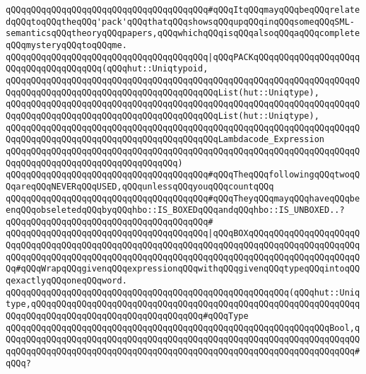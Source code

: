 \verb|qQQqqQQqqQQqqQQqqQQqqQQqqQQqqQQqqQQqqQQq#qQQqItqQQqmayqQQqbeqQQqrelatedqQQqtoqQQqtheqQQq'pack'qQQqthatqQQqshowsqQQqupqQQqinqQQqsomeqQQqSML-semanticsqQQqtheoryqQQqpapers,qQQqwhichqQQqisqQQqalsoqQQqaqQQqcompleteqQQqmysteryqQQqtoqQQqme.|\newline
\verb|qQQqqQQqqQQqqQQqqQQqqQQqqQQqqQQqqQQqqQQq|\verb#|qQQqPACKqQQqqQQqqQQqqQQqqQQqqQQqqQQqqQQqqQQqqQQq(qQQqhut::Uniqtypoid,#\newline
\verb|qQQqqQQqqQQqqQQqqQQqqQQqqQQqqQQqqQQqqQQqqQQqqQQqqQQqqQQqqQQqqQQqqQQqqQQqqQQqqQQqqQQqqQQqqQQqqQQqqQQqqQQqqQQqqQQqList(hut::Uniqtype),|\newline
\verb|qQQqqQQqqQQqqQQqqQQqqQQqqQQqqQQqqQQqqQQqqQQqqQQqqQQqqQQqqQQqqQQqqQQqqQQqqQQqqQQqqQQqqQQqqQQqqQQqqQQqqQQqqQQqqQQqList(hut::Uniqtype),|\newline
\verb|qQQqqQQqqQQqqQQqqQQqqQQqqQQqqQQqqQQqqQQqqQQqqQQqqQQqqQQqqQQqqQQqqQQqqQQqqQQqqQQqqQQqqQQqqQQqqQQqqQQqqQQqqQQqqQQqLambdacode_Expression|\newline
\verb|qQQqqQQqqQQqqQQqqQQqqQQqqQQqqQQqqQQqqQQqqQQqqQQqqQQqqQQqqQQqqQQqqQQqqQQqqQQqqQQqqQQqqQQqqQQqqQQqqQQqqQQq)|\newline
\newline
\verb|qQQqqQQqqQQqqQQqqQQqqQQqqQQqqQQqqQQqqQQq#qQQqTheqQQqfollowingqQQqtwoqQQqareqQQqNEVERqQQqUSED,qQQqunlessqQQqyouqQQqcountqQQq|\newline
\verb|qQQqqQQqqQQqqQQqqQQqqQQqqQQqqQQqqQQqqQQq#qQQqTheyqQQqmayqQQqhaveqQQqbeenqQQqobseletedqQQqbyqQQqhbo::IS_BOXEDqQQqandqQQqhbo::IS_UNBOXED..?|\newline
\verb|qQQqqQQqqQQqqQQqqQQqqQQqqQQqqQQqqQQqqQQq#|\newline
\verb|qQQqqQQqqQQqqQQqqQQqqQQqqQQqqQQqqQQqqQQq|\verb#|qQQqBOXqQQqqQQqqQQqqQQqqQQqqQQqqQQqqQQqqQQqqQQqqQQqqQQqqQQqqQQqqQQqqQQqqQQqqQQqqQQqqQQqqQQqqQQqqQQqqQQqqQQqqQQqqQQqqQQqqQQqqQQqqQQqqQQqqQQqqQQqqQQqqQQqqQQqqQQqqQQqqQQqqQQq#\verb|#qQQqWrapqQQqgivenqQQqexpressionqQQqwithqQQqgivenqQQqtypeqQQqintoqQQqexactlyqQQqoneqQQqword.|\newline
\verb|qQQqqQQqqQQqqQQqqQQqqQQqqQQqqQQqqQQqqQQqqQQqqQQqqQQqqQQq(qQQqhut::Uniqtype,qQQqqQQqqQQqqQQqqQQqqQQqqQQqqQQqqQQqqQQqqQQqqQQqqQQqqQQqqQQqqQQqqQQqqQQqqQQqqQQqqQQqqQQqqQQqqQQqqQQqqQQq#qQQqType|\newline
\verb|qQQqqQQqqQQqqQQqqQQqqQQqqQQqqQQqqQQqqQQqqQQqqQQqqQQqqQQqqQQqqQQqBool,qQQqqQQqqQQqqQQqqQQqqQQqqQQqqQQqqQQqqQQqqQQqqQQqqQQqqQQqqQQqqQQqqQQqqQQqqQQqqQQqqQQqqQQqqQQqqQQqqQQqqQQqqQQqqQQqqQQqqQQqqQQqqQQqqQQqqQQqqQQq#qQQq?|\newline
